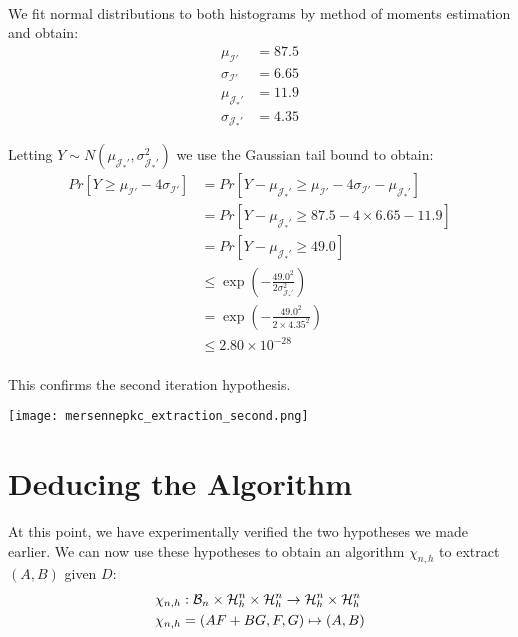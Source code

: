 \paragraph{}
We fit normal distributions to both histograms by method of moments estimation and obtain:
\begin{align*}
    \mu_{\mathcal{I}'} &= 87.5\\
    \sigma_{\mathcal{I}'} &= 6.65\\
    \mu_{\mathcal{J}_*'} &= 11.9\\
    \sigma_{\mathcal{J}_*'} &= 4.35
\end{align*}

Letting $Y \sim N(\mu_{\mathcal{J}_*'}, \sigma_{\mathcal{J}_*'}^2)$ we use the Gaussian tail bound to obtain:
\begin{align*}
    Pr[Y \geq \mu_{\mathcal{I}'} - 4 \sigma_{\mathcal{I}'}] &= Pr[Y - \mu_{\mathcal{J}_*'} \geq \mu_{\mathcal{I}'} - 4 \sigma_{\mathcal{I}'} - \mu_{\mathcal{J}_*'}]\\
    &= Pr[Y - \mu_{\mathcal{J}_*'} \geq 87.5 - 4 \times 6.65 - 11.9]\\
    &= Pr[Y - \mu_{\mathcal{J}_*'} \geq 49.0]\\
    &\leq \exp{(-\frac{49.0^2}{2 \sigma_{\mathcal{J}_*'}^2})}\\
    &= \exp{(-\frac{49.0^2}{2 \times 4.35^2})}\\
    &\leq 2.80 \times 10^{-28}
\end{align*}

\paragraph{}
This confirms the second iteration hypothesis.

\texttt{[image: mersennepkc\_extraction\_second.png]}

\section{Deducing the Algorithm}\label{msg_ext_deduction}

At this point, we have experimentally verified the two hypotheses we made earlier. We can now use these hypotheses to obtain an algorithm $\chi_{n, h}$ to extract $(A, B)$ given $D$:
\begin{align*}
\chi_{n, h} &: \mathcal{B}_n \times \mathcal{H}_h^n \times \mathcal{H}_h^n \rightarrow \mathcal{H}_h^n \times \mathcal{H}_h^n\\
\chi_{n, h} &= (AF + BG, F, G) \mapsto (A, B)
\end{align*}

